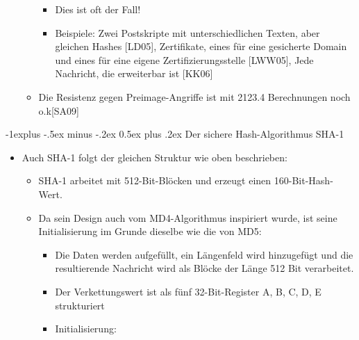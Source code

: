 \documentclass[a4paper]{article}
\makeatletter
\renewcommand{\subsection}{\@startsection{subsection}{2}{0mm}%
 {-1explus -.5ex minus -.2ex}%
 {0.5ex plus .2ex}%
 {\normalfont\normalsize\bfseries}}
\makeatother
\begin{document}
\begin{multicols}{3}
\begin{itemize}
\begin{itemize}
                        \begin{itemize}
                            \item
                                  Dies ist oft der Fall!
                            \item
                                  Beispiele: Zwei Postskripte mit unterschiedlichen Texten, aber
                                  gleichen Hashes {[}LD05{]}, Zertifikate, eines für eine gesicherte
                                  Domain und eines für eine eigene Zertifizierungsstelle
                                  {[}LWW05{]}, Jede Nachricht, die erweiterbar ist {[}KK06{]}
                        \end{itemize}
                  \item
                        Die Resistenz gegen Preimage-Angriffe ist mit 2123.4 Berechnungen
                        noch o.k{[}SA09{]}
              \end{itemize}
    \end{itemize}


    \subsection{Der sichere Hash-Algorithmus
        SHA-1}

    \begin{itemize}
        \item
              Auch SHA-1 folgt der gleichen Struktur wie oben beschrieben:

              \begin{itemize}
                  \item
                        SHA-1 arbeitet mit 512-Bit-Blöcken und erzeugt einen
                        160-Bit-Hash-Wert.
                  \item
                        Da sein Design auch vom MD4-Algorithmus inspiriert wurde, ist seine
                        Initialisierung im Grunde dieselbe wie die von MD5:

                        \begin{itemize}
                            \item
                                  Die Daten werden aufgefüllt, ein Längenfeld wird hinzugefügt und
                                  die resultierende Nachricht wird als Blöcke der Länge 512 Bit
                                  verarbeitet.
                            \item
                                  Der Verkettungswert ist als fünf 32-Bit-Register A, B, C, D, E
                                  strukturiert
                            \item
                                  Initialisierung:


\end{itemize}
\end{itemize}
\end{itemize}
\end{multicols}
\end{document}
